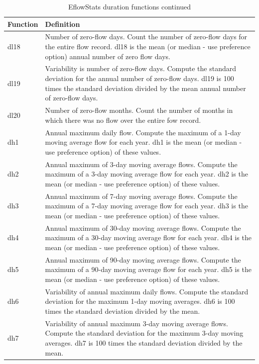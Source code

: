 \documentclass[a4paper,11pt]{article}\usepackage[]{graphicx}\usepackage[]{color}
\begin{document}
\begin{table}[ht]
  \centering
  \begin{threeparttable}[b]
  \caption{EflowStats duration functions continued}
  \label{tab:dur2Stats}
  \begin{tabularx}{\textwidth}{|l|X|}
  \hline
\textbf{Function} & \textbf{Definition} \\ 
  \hline
  dl18 & Number of zero-flow days. Count the number of zero-flow days for the entire flow record. dl18 is the mean (or median - use preference option) annual number of zero flow days. \\
  dl19 & Variability is number of zero-flow days. Compute the standard deviation for the annual number of zero-flow days. dl19 is 100 times the standard deviation divided by the mean annual number of zero-flow days. \\
  dl20 & Number of zero-flow months. Count the number of months in which there was no flow over the entire fow record. \\
  dh1 & Annual maximum daily flow. Compute the maximum of a 1-day moving average flow for each year. dh1 is the mean (or median - use preference option) of these values. \\
  dh2 & Annual maximum of 3-day moving average flows. Compute the maximum of a 3-day moving average flow for each year. dh2 is the mean (or median - use preference option) of these values. \\
  dh3 & Annual maximum of 7-day moving average flows. Compute the maximum of a 7-day moving average flow for each year. dh3 is the mean (or median - use preference option) of these values. \\
  dh4 & Annual maximum of 30-day moving average flows. Compute the maximum of a 30-day moving average flow for each year. dh4 is the mean (or median - use preference option) of these values. \\
  dh5 & Annual maximum of 90-day moving average flows. Compute the maximum of a 90-day moving average flow for each year. dh5 is the mean (or median - use preference option) of these values. \\
  dh6 & Variability of annual maximum daily flows. Compute the standard deviation for the maximum 1-day moving averages. dh6 is 100 times the standard deviation divided by the mean. \\
  dh7 & Variability of annual maximum 3-day moving average flows. Compute the standard deviation for the maximum 3-day moving averages. dh7 is 100 times the standard deviation divided by the mean. \\

\end{tabularx}
\end{threeparttable}
\end{table}
\end{document}
